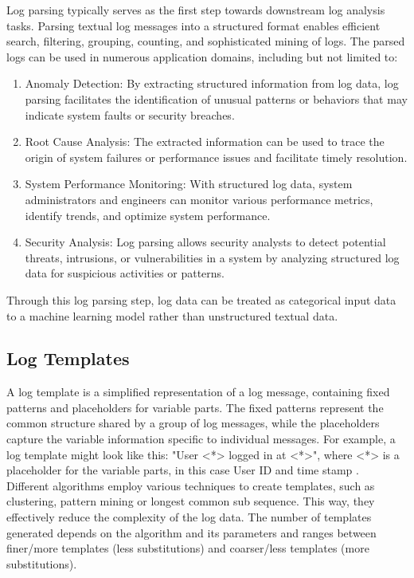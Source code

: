 Log parsing typically serves as the first step towards downstream log analysis tasks. Parsing textual log messages into a structured format enables efficient search, filtering, grouping, counting, and sophisticated mining of logs. The parsed logs can be used in numerous application domains, including but not limited to:

\begin{enumerate}
    \item  Anomaly Detection: By extracting structured information from log data, log parsing facilitates the identification of unusual patterns or behaviors that may indicate system faults or security breaches.
    \item Root Cause Analysis: The extracted information can be used to trace the origin of system failures or performance issues and facilitate timely resolution.
    \item System Performance Monitoring: With structured log data, system administrators and engineers can monitor various performance metrics, identify trends, and optimize system performance.
    \item Security Analysis: Log parsing allows security analysts to detect potential threats, intrusions, or vulnerabilities in a system by analyzing structured log data for suspicious activities or patterns.
\end{enumerate}
Through this log parsing step, log data can be treated as categorical input data to a machine learning model rather than unstructured textual data.

\subsection{Log Templates}
\label{sec:Methods:Fundamentals:Templates}
A log template is a simplified representation of a log message, containing fixed patterns and placeholders for variable parts. The fixed patterns represent the common structure shared by a group of log messages, while the placeholders capture the variable information specific to individual messages. For example, a log template might look like this: "User <*> logged in at <*>", where <*> is a placeholder for the variable parts, in this case User ID and time stamp \cite{zhu2019tools}. \\

Different algorithms employ various techniques to create templates, such as clustering, pattern mining or longest common sub sequence. This way, they effectively reduce the complexity of the log data. The number of templates generated depends on the algorithm and its parameters and ranges between finer/more templates (less substitutions) and coarser/less templates (more substitutions). \\

